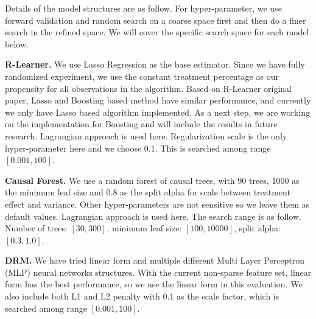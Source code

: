 Details of the model structures are as follow. For hyper-parameter, we use forward validation and random search on a coarse space first and then do a finer search in the refined space. We will cover the specific search space for each model below.

\textbf{R-Learner.} We use Lasso Regression \cite{tibshirani1996regression} as the base estimator. Since we have fully randomized experiment, we use the constant treatment percentage as our propensity for all observations in the algorithm. Based on R-Learner original paper, Lasso and Boosting based method have similar performance, and currently we only have Lasso based algorithm implemented. As a next step, we are working on the implementation for Boosting and will include the results in future research. Lagrangian approach is used here. Regularization scale is the only hyper-parameter here and we choose 0.1. This is searched among range $[0.001, 100]$.

\textbf{Causal Forest.} We use a random forest of causal trees, with 90 trees, 1000 as the minimum leaf size and 0.8 as the split alpha for scale between treatment effect and variance. Other hyper-parameters are not sensitive so we leave them as default values. Lagrangian approach is used here. The search range is as follow. Number of trees: $[30, 300]$, minimum leaf size: $[100, 10000]$, split alpha: $[0.3, 1.0]$.

\textbf{DRM.} We have tried linear form and multiple different Multi Layer Perceptron (MLP) neural networks structures. With the current non-sparse feature set, linear form has the best performance, so we use the linear form in this evaluation. We also include both L1 and L2 penalty with 0.1 as the scale factor, which is searched among range $[0.001, 100]$.

